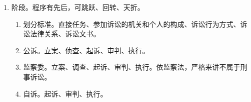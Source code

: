 \begin{enumerate}
\begin{enumerate}
\begin{enumerate}
                  \item 混合式。职权主义吸收当事人主义，然后反转为以当事人为主。反转为人。。
                \end{enumerate}
        \end{enumerate}
  \item 阶段。程序有先后，可跳跃、回转、天折。
        \begin{enumerate}
          \item 划分标准。直接任务、参加诉讼的机关和个人的构成、诉讼行为方式、诉讼法律关系、诉讼文书。
          \item 公诉。立案、侦查、起诉、审判、执行。
          \item 监察委。立案、调查、起诉、审判、执行。依监察法，严格来讲不属于刑事诉讼。
          \item 自诉。起诉、审判、执行。
        \end{enumerate}
\end{enumerate}
